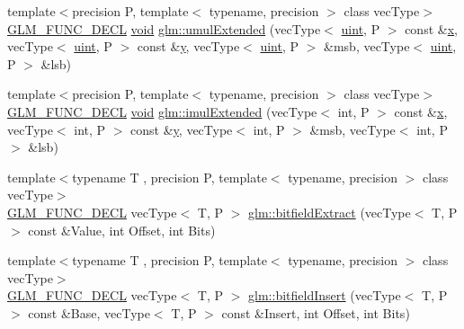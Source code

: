 \begin{DoxyCompactItemize}
{\footnotesize template$<$precision P, template$<$ typename, precision $>$ class vec\+Type$>$ }\\\mbox{\hyperlink{setup_8hpp_ab2d052de21a70539923e9bcbf6e83a51}{G\+L\+M\+\_\+\+F\+U\+N\+C\+\_\+\+D\+E\+CL}} \mbox{\hyperlink{glad_8h_a950fc91edb4504f62f1c577bf4727c29}{void}} \mbox{\hyperlink{group__core__func__integer_ga456ff9dcec42f6769a9ae2a2af7f1ce1}{glm\+::umul\+Extended}} (vec\+Type$<$ \mbox{\hyperlink{group__core__precision_ga4fd29415871152bfb5abd588334147c8}{uint}}, P $>$ const \&\mbox{\hyperlink{glad_8h_a92d0386e5c19fb81ea88c9f99644ab1d}{x}}, vec\+Type$<$ \mbox{\hyperlink{group__core__precision_ga4fd29415871152bfb5abd588334147c8}{uint}}, P $>$ const \&\mbox{\hyperlink{glad_8h_a66ddd433d2cacfe27f5906b7e86faeed}{y}}, vec\+Type$<$ \mbox{\hyperlink{group__core__precision_ga4fd29415871152bfb5abd588334147c8}{uint}}, P $>$ \&msb, vec\+Type$<$ \mbox{\hyperlink{group__core__precision_ga4fd29415871152bfb5abd588334147c8}{uint}}, P $>$ \&lsb)
\item 
{\footnotesize template$<$precision P, template$<$ typename, precision $>$ class vec\+Type$>$ }\\\mbox{\hyperlink{setup_8hpp_ab2d052de21a70539923e9bcbf6e83a51}{G\+L\+M\+\_\+\+F\+U\+N\+C\+\_\+\+D\+E\+CL}} \mbox{\hyperlink{glad_8h_a950fc91edb4504f62f1c577bf4727c29}{void}} \mbox{\hyperlink{group__core__func__integer_ga6e6e8b29ca40d8ca2df10b58ed17d426}{glm\+::imul\+Extended}} (vec\+Type$<$ int, P $>$ const \&\mbox{\hyperlink{glad_8h_a92d0386e5c19fb81ea88c9f99644ab1d}{x}}, vec\+Type$<$ int, P $>$ const \&\mbox{\hyperlink{glad_8h_a66ddd433d2cacfe27f5906b7e86faeed}{y}}, vec\+Type$<$ int, P $>$ \&msb, vec\+Type$<$ int, P $>$ \&lsb)
\item 
{\footnotesize template$<$typename T , precision P, template$<$ typename, precision $>$ class vec\+Type$>$ }\\\mbox{\hyperlink{setup_8hpp_ab2d052de21a70539923e9bcbf6e83a51}{G\+L\+M\+\_\+\+F\+U\+N\+C\+\_\+\+D\+E\+CL}} vec\+Type$<$ T, P $>$ \mbox{\hyperlink{group__core__func__integer_gab84b88f3a8e367774e5dd1c618c353cf}{glm\+::bitfield\+Extract}} (vec\+Type$<$ T, P $>$ const \&Value, int Offset, int Bits)
\item 
{\footnotesize template$<$typename T , precision P, template$<$ typename, precision $>$ class vec\+Type$>$ }\\\mbox{\hyperlink{setup_8hpp_ab2d052de21a70539923e9bcbf6e83a51}{G\+L\+M\+\_\+\+F\+U\+N\+C\+\_\+\+D\+E\+CL}} vec\+Type$<$ T, P $>$ \mbox{\hyperlink{group__core__func__integer_ga5681dfac9239beb1b8bd995e3c6496d7}{glm\+::bitfield\+Insert}} (vec\+Type$<$ T, P $>$ const \&Base, vec\+Type$<$ T, P $>$ const \&Insert, int Offset, int Bits)

\end{DoxyCompactItemize}
